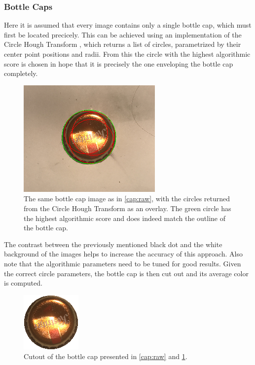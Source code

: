 \documentclass{article}
\begin{document}
\subsubsection{Bottle Caps} \label{caps}
Here it is assumed that every image contains only a single bottle cap, which must first be located precicely. 
This can be achieved using an implementation of the Circle Hough Transform \cite{DAVIES198837}, which returns a list of circles, parametrized by their center point positions and radii. From this the circle with the highest algorithmic score is chosen in hope that it is precisely the one enveloping the bottle cap completely. 
\begin{figure}[h]
        \begin{center}
        \includegraphics[width=0.5\linewidth]{cap_hough.png}
	\caption{The same bottle cap image as in \ref{cap:raw}, with the circles returned from the Circle Hough Transform as an overlay. The green circle has the highest algorithmic score and does indeed match the outline of the bottle cap.}
        \label{cap:hough}
\end{center}
\end{figure}
  
The contrast between the previously mentioned black dot and the white background of the images helps to increase the accuracy of this approach. 
Also note that the algorithmic parameters need to be tuned for good results. 
Given the correct circle parameters, the bottle cap is then cut out and its average color is computed. 
\begin{figure}[h]
        \begin{center}
        \includegraphics[width=0.3\linewidth]{cap_cutout_white_2.png}
	\caption{Cutout of the bottle cap presented in \ref{cap:raw} and \ref{cap:hough}.}
        \label{cap:cut}
\end{center}
\end{figure}
\end{document}
